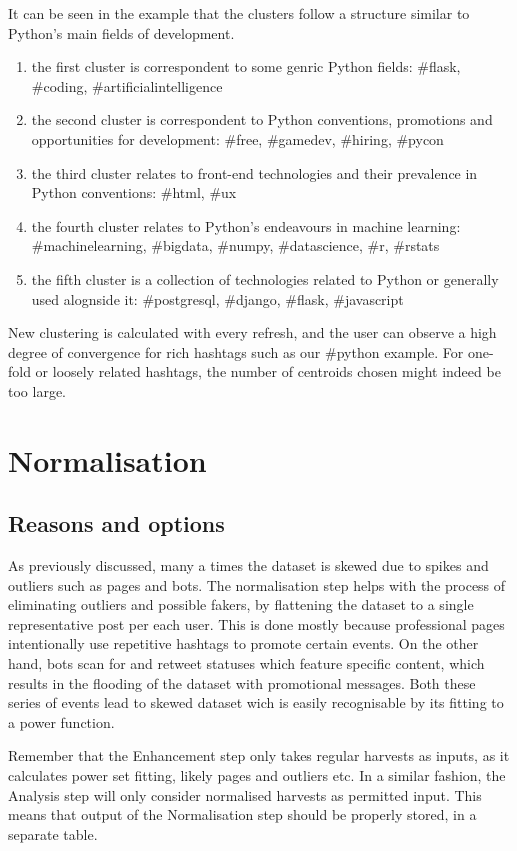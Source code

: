 \documentclass[12pt,a4paper,twoside]{report}
\begin{document}
It can be seen in the example that the clusters follow a structure similar to Python's main fields of development.

\begin{enumerate}
\item the first cluster is correspondent to some genric Python fields: \#flask, \#coding, \#artificialintelligence
\item the second cluster is correspondent to Python conventions, promotions and opportunities for development: \#free, \#gamedev, \#hiring, \#pycon
\item the third cluster relates to front-end technologies and their prevalence in Python conventions: \#html, \#ux
\item the fourth cluster relates to Python's endeavours in machine learning: \#machinelearning, \#bigdata, \#numpy, \#datascience, \#r, \#rstats
\item the fifth cluster is a collection of technologies related to Python or generally used alognside it: \#postgresql, \#django, \#flask, \#javascript
\end{enumerate}

New clustering is calculated with every refresh, and the user can observe a high degree of convergence for rich hashtags such as our \#python example. For one-fold or loosely related hashtags, the number of centroids chosen might indeed be too large.

\section{Normalisation}
\subsection{Reasons and options}
As previously discussed, many a times the dataset is skewed due to spikes and outliers such as pages and bots. The normalisation step helps with the process of eliminating outliers and possible fakers, by flattening the dataset to a single representative post per each user. This is done mostly because professional pages intentionally use repetitive hashtags to promote certain events. On the other hand, bots scan for and retweet statuses which feature specific content, which results in the flooding of the dataset with promotional messages. Both these series of events lead to skewed dataset wich is easily recognisable by its fitting to a power function.

Remember that the Enhancement step only takes regular harvests as inputs, as it calculates power set fitting, likely pages and outliers etc. In a similar fashion, the Analysis step will only consider normalised harvests as permitted input. This means that output of the Normalisation step should be properly stored, in a separate table.
\end{document}
